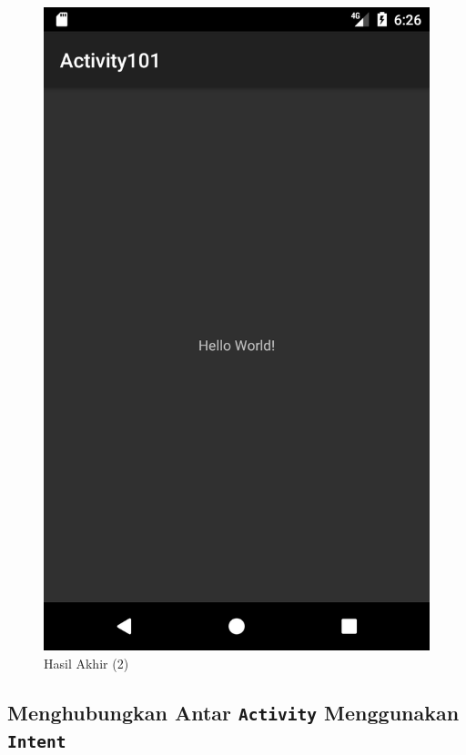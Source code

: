\documentclass{scrartcl}
\begin{document}
\begin{enumerate}
\begin{figure}[htbp]
\begin{minipage}{.5\textwidth}
		\includegraphics[width=0.7\linewidth]{Screenshot_1496834779}
		\caption{Hasil Akhir (2)}
		\label{fig:screenshot_1496834779}
	\end{minipage}
	\end{figure}

\end{enumerate}

\subsection{Menghubungkan Antar \texttt{Activity} Menggunakan \texttt{Intent}}
\end{document}
